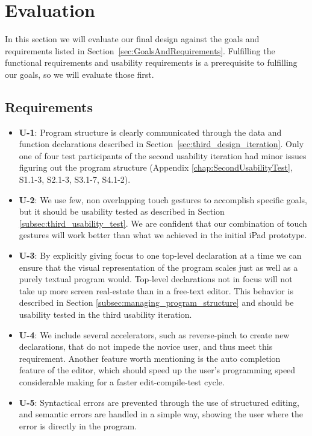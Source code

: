 \chapter{Evaluation}
\label{sec:Evaluation}
In this section we will evaluate our final design against the goals and requirements listed in Section~\ref{sec:GoalsAndRequirements}.
Fulfilling the functional requirements and usability requirements is a
prerequisite to fulfilling our goals, so we will evaluate those first.

\section{Requirements}
\begin{itemize}

\item \textbf{U-1}: Program structure is clearly communicated through the data and function declarations described in Section~\ref{sec:third_design_iteration}.
Only one of four test participants of the second usability iteration had minor
issues figuring out the program structure (Appendix \ref{chap:SecondUsabilityTest},
S1.1-3, S2.1-3, S3.1-7, S4.1-2).
\item \textbf{U-2}: We use few, non overlapping touch gestures to accomplish specific goals,
but it should be usability tested as described in Section \ref{subsec:third_usability_test}.
We are confident that our combination of touch gestures will work better than
what we achieved in the initial iPad prototype.
\item \textbf{U-3}: By explicitly giving focus to one top-level declaration at
a time we can ensure that the visual representation of the program scales just
as well as a purely textual program would. Top-level declarations not in focus
will not take up more screen real-estate than in a free-text editor. This
behavior is described in Section \ref{subsec:managing_program_structure} and
should be usability tested in the third usability iteration.
\item \textbf{U-4}: We include several accelerators, such as reverse-pinch to create new declarations, that do not impede the novice user, and thus meet this requirement.
Another feature worth mentioning is the auto completion feature of the editor,
which should speed up the user's programming speed considerable making for a
faster edit-compile-test cycle.
\item \textbf{U-5}: Syntactical errors are prevented through the use of structured editing, and semantic errors are handled in a simple way, showing the user where the error is directly in the program.

\end{itemize}
